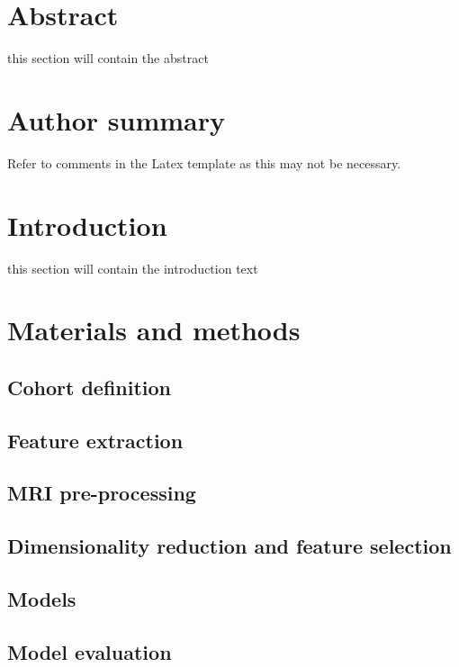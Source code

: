\documentclass[10pt,letterpaper]{article}
\begin{document}
\section*{Abstract}
this section will contain the abstract

\section*{Author summary}
Refer to comments in the Latex template as this may not be necessary.

\linenumbers

\section*{Introduction}
this section will contain the introduction text

\section*{Materials and methods}

\subsection*{Cohort definition}


\subsection*{Feature extraction}


\subsection*{MRI pre-processing}


\subsection*{Dimensionality reduction and feature selection}

\subsection*{Models}

\subsection*{Model evaluation}
\end{document}
